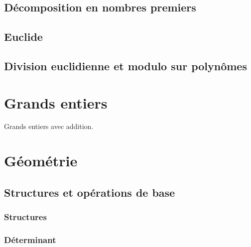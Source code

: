\documentclass{article}
\begin{document}

\subsection{Décomposition en nombres premiers}


\subsection{Euclide}


\subsection{Division euclidienne et modulo sur polynômes}


\section{Grands entiers}

Grands entiers avec addition.



\section{G\'eom\'etrie}

\subsection{Structures et opérations de base}

\subsubsection{Structures}


\subsubsection{Déterminant}
\end{document}
